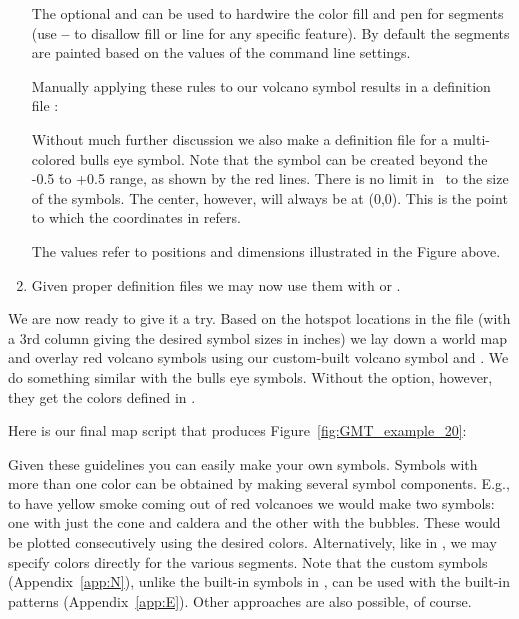 \begin{enumerate}
The optional  and  can be used to hardwire
the color fill and pen for segments (use \textbf{--} to disallow
fill or line for any specific feature).  By default the segments
are painted based on the values of the command line settings.

Manually applying these rules to our volcano symbol results in a
definition file :


Without much further discussion we also make a definition file  for a multi-colored bulls eye symbol.
Note that the symbol can be created beyond the -0.5 to +0.5 range, as shown by the red lines. There is no limit in
\GMT\ to the size of the symbols. The center, however, will always be at (0,0). This is the point to which the
coordinates in  refers.


The values refer to positions and dimensions illustrated in the Figure above.

\item Given proper definition files we may now use them with  or .
\end{enumerate}

We are now ready to give it a try.  Based on the hotspot
locations in the file  (with a 3rd column
giving the desired symbol sizes in inches) we lay down a
world map and overlay red volcano symbols using our custom-built
volcano symbol and . We do something similar with the bulls eye symbols.
Without the  option, however, they get the colors defined in .

Here is our final map script that produces Figure~\ref{fig:GMT_example_20}:


Given these guidelines you can easily make your own symbols.
Symbols with more than one color can be obtained by making
several symbol components.  E.g., to have yellow smoke coming
out of red volcanoes we would make two symbols: one with just
the cone and caldera and the other with the bubbles.  These
would be plotted consecutively using the desired colors.
Alternatively, like in , we may
specify colors directly for the various segments.  Note that
the custom symbols (Appendix~\ref{app:N}), unlike the built-in symbols in \GMT, can
be used with the built-in patterns (Appendix~\ref{app:E}).  Other
approaches are also possible, of course.

